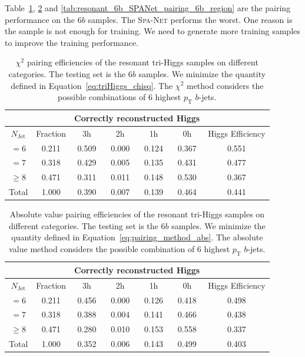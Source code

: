 \documentclass[12pt]{article}
\begin{document}
    Table~\ref{tab:resonant_chi2_pairing_6b_region}, \ref{tab:resonant_abs_pairing_6b_region} and \ref{tab:resonant_6b_SPANet_pairing_6b_region} are the pairing performance on the $6b$ samples. The \textsc{Spa-Net} performs the worst. One reason is the sample is not enough for training. We need to generate more training samples to improve the training performance.
    \begin{table}[htpb]
		\centering
        \caption{$\chi^2$ pairing efficiencies of the resonant tri-Higgs samples on different categories. The testing set is the $6b$ samples. We minimize the quantity defined in Equation~\ref{eq:triHiggs_chisq}. The $\chi^2$ method considers the possible combinations of 6 highest $p_{\text{T}}$ $b$-jets.}
		\label{tab:resonant_chi2_pairing_6b_region}
		\begin{tabular}{c|c|cccc|c}
        \multicolumn{1}{l|}{} &          & \multicolumn{4}{c|}{Correctly reconstructed Higgs} & \multicolumn{1}{l}{} \\ \hline
        $N_\text{Jet}$        & Fraction & 3h          & 2h         & 1h         & 0h         & Higgs Efficiency     \\ \hline
        $=6$                  & 0.211 & 0.509 & 0.000 & 0.124 & 0.367 & 0.551                \\
        $=7$                  & 0.318 & 0.429 & 0.005 & 0.135 & 0.431 & 0.477                \\
        $\ge 8$               & 0.471 & 0.311 & 0.011 & 0.148 & 0.530 & 0.367                \\ \hline
        Total                 & 1.000 & 0.390 & 0.007 & 0.139 & 0.464 & 0.441               
		\end{tabular}
    \end{table}
    \begin{table}[htpb]
		\centering
		\caption{Absolute value pairing efficiencies of the resonant tri-Higgs samples on different categories. The testing set is the $6b$ samples. We minimize the quantity defined in Equation~\ref{eq:pairing_method_abs}. The absolute value method considers the possible combination of 6 highest $p_{\text{T}}$ $b$-jets.}
		\label{tab:resonant_abs_pairing_6b_region}
        \begin{tabular}{c|c|cccc|c}
            \multicolumn{1}{l|}{} &          & \multicolumn{4}{c|}{Correctly reconstructed Higgs} & \multicolumn{1}{l}{} \\ \hline
            $N_{\text{Jet}}$    & Fraction & 3h          & 2h         & 1h         & 0h         & Higgs Efficiency     \\ \hline
            $=6$                  & 0.211 & 0.456 & 0.000 & 0.126 & 0.418 & 0.498 \\
            $=7$                  & 0.318 & 0.388 & 0.004 & 0.141 & 0.466 & 0.438 \\
            $\ge 8$               & 0.471 & 0.280 & 0.010 & 0.153 & 0.558 & 0.337 \\ \hline
            Total                 & 1.000 & 0.352 & 0.006 & 0.143 & 0.499 & 0.403 
		\end{tabular}
	\end{table}
\end{document}
